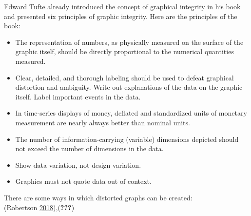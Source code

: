 \documentclass[]{book}
\providecommand{\tightlist}{%
  \setlength{\itemsep}{0pt}\setlength{\parskip}{0pt}}
\begin{document}
Edward Tufte already introduced the concept of graphical integrity in
his book and presented six principles of graphic integrity. Here are the
principles of the book:

\begin{itemize}
\tightlist
\item
  The representation of numbers, as physically measured on the surface
  of the graphic itself, should be directly proportional to the
  numerical quantities measured.
\item
  Clear, detailed, and thorough labeling should be used to defeat
  graphical distortion and ambiguity. Write out explanations of the data
  on the graphic itself. Label important events in the data.
\item
  In time-series displays of money, deﬂated and standardized units of
  monetary measurement are nearly always better than nominal units.
\item
  The number of information-carrying (variable) dimensions depicted
  should not exceed the number of dimensions in the data.
\item
  Show data variation, not design variation.
\item
  Graphics must not quote data out of context.
\end{itemize}

There are some ways in which distorted graphs can be created:\\
(Robertson \protect\hyperlink{ref-evil_axes}{2018}),({\textbf{???}})
\end{document}
